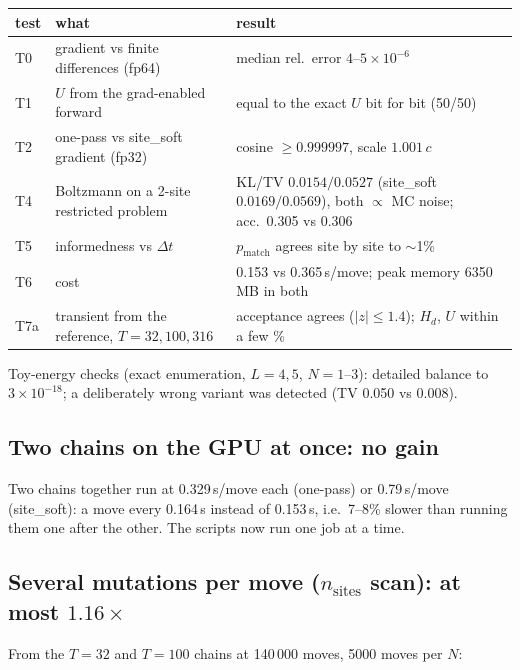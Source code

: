 \documentclass[11pt,a4paper]{article}
\newcommand{\dt}{\Delta t}
\newcommand{\Hd}{H_d}
\begin{document}
\begin{center}
\small
\begin{tabular}{R{1.1cm}R{5.6cm}R{7.2cm}}
\toprule
test & what & result \\
\midrule
T0 & gradient vs finite differences (fp64) & median rel.\ error $4$--$5\times10^{-6}$ \\
T1 & $U$ from the grad-enabled forward & equal to the exact $U$ bit for bit (50/50) \\
T2 & one-pass vs site\_soft gradient (fp32) & cosine $\ge0.999997$, scale $1.001\,c$ \\
T4 & Boltzmann on a 2-site restricted problem & KL/TV $0.0154/0.0527$ (site\_soft $0.0169/0.0569$), both $\propto$ MC noise; acc.\ 0.305 vs 0.306 \\
T5 & informedness vs $\dt$ & $p_{\mathrm{match}}$ agrees site by site to $\sim$1\% \\
T6 & cost & 0.153 vs 0.365\,s/move; peak memory 6350\,MB in both \\
T7a & transient from the reference, $T=32,100,316$ & acceptance agrees ($|z|\le1.4$); $\Hd$, $U$ within a few \% \\
\bottomrule
\end{tabular}
\end{center}
Toy-energy checks (exact enumeration, $L=4,5$, $N=1$--3): detailed balance to
$3\times10^{-18}$; a deliberately wrong variant was detected (TV 0.050 vs
0.008).

\subsection{Two chains on the GPU at once: no gain}

Two chains together run at 0.329\,s/move each (one-pass) or 0.79\,s/move
(site\_soft): a move every 0.164\,s instead of 0.153\,s, i.e.\ 7--8\% slower
than running them one after the other. The scripts now run one job at a time.

\subsection{Several mutations per move ($n_{\mathrm{sites}}$ scan): at most $1.16\times$}

From the $T=32$ and $T=100$ chains at 140\,000 moves, 5000 moves per $N$:
\end{document}
